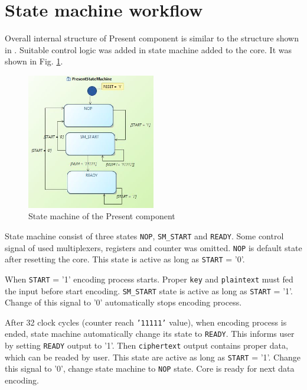 \documentclass{gajewski}
\begin{document}
\newpage

\section{State machine workflow}

Overall internal structure of Present component is similar to the structure shown in \cite{PRESENT}. Suitable control logic was added in state machine added
to the core. It was shown in Fig. \ref{presentSM}.

\begin{figure}[!ht]%
    \begin{center}
    \includegraphics[width=0.5\textwidth]{img/SM.jpg}
    \caption{%
        State machine of the Present component
     }%
    \label{presentSM}
    \end{center}
 \end{figure}

State machine consist of three states \texttt{NOP}, \texttt{SM\_START} and \texttt{READY}. Some control signal of used multiplexers, registers and counter was omitted. \texttt{NOP} is default state after resetting the core. This state is active as long as \texttt{START} = '0'.

When \texttt{START} = '1' encoding process starts. Proper \texttt{key} and \texttt{plaintext} must fed the input before start encoding. \texttt{SM\_START} state is active as long as \texttt{START} = '1'. Change of this signal to '0' automatically stops encoding process. 

After 32 clock cycles (counter reach \texttt{'11111'} value), when encoding process is ended, state machine automatically change its state to \texttt{READY}. This informs user by setting \texttt{READY} output to '1'. Then \texttt{ciphertext} output contains proper data, which can be readed by user. This state are active as long as \texttt{START} = '1'. Change this signal to '0', change state machine to \texttt{NOP} state. Core is ready for next data encoding.
\end{document}
